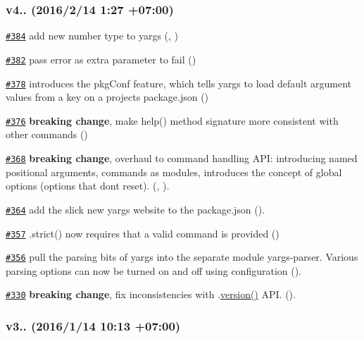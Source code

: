 \subsubsection*{v4.. (2016/2/14 1\+:27 +07\+:00)}


\begin{DoxyItemize}
\item \href{https://github.com/bcoe/yargs/pull/384}{\tt \#384} add new number type to yargs (, )
\item \href{https://github.com/bcoe/yargs/pull/382}{\tt \#382} pass error as extra parameter to fail ()
\item \href{https://github.com/bcoe/yargs/pull/378}{\tt \#378} introduces the pkg\+Conf feature, which tells yargs to load default argument values from a key on a project\textquotesingle{}s package.\+json ()
\item \href{https://github.com/bcoe/yargs/pull/376}{\tt \#376} {\bfseries breaking change}, make help() method signature more consistent with other commands ()
\item \href{https://github.com/bcoe/yargs/pull/368}{\tt \#368} {\bfseries breaking change}, overhaul to command handling A\+PI\+: introducing named positional arguments, commands as modules, introduces the concept of global options (options that don\textquotesingle{}t reset). (, ).
\item \href{https://github.com/bcoe/yargs/pull/364}{\tt \#364} add the slick new yargs website to the package.\+json ().
\item \href{https://github.com/bcoe/yargs/pull/357}{\tt \#357} .strict() now requires that a valid command is provided ()
\item \href{https://github.com/bcoe/yargs/pull/356}{\tt \#356} pull the parsing bits of yargs into the separate module yargs-\/parser. Various parsing options can now be turned on and off using configuration ().
\item \href{https://github.com/bcoe/yargs/pull/330}{\tt \#330} {\bfseries breaking change}, fix inconsistencies with {\ttfamily .\mbox{\hyperlink{namespacesetup_a2aa722b36a933088812b50ea79b97a5c}{version()}}} A\+PI. ().
\end{DoxyItemize}

\subsubsection*{v3.. (2016/1/14 10\+:13 +07\+:00)}


